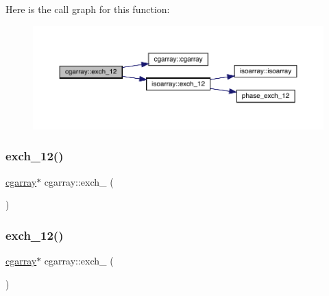 Here is the call graph for this function\+:
\nopagebreak
\begin{figure}[H]
\begin{center}
\leavevmode
\includegraphics[width=350pt]{d7/d55/classcgarray_a59212ed070a6ebdc199063d7c7eaee50_cgraph}
\end{center}
\end{figure}
\mbox{\label{classcgarray_a86ce4d7c72cddf62047e018d1199df8c}} 
\subsubsection{\texorpdfstring{exch\_12()}{exch\_12()}\hspace{0.1cm}{\footnotesize\ttfamily [2/3]}}
{\footnotesize\ttfamily \mbox{\hyperlink{classcgarray}{cgarray}}$\ast$ cgarray\+::exch\+\_ (\begin{DoxyParamCaption}{ }\end{DoxyParamCaption})}

\mbox{\label{classcgarray_a86ce4d7c72cddf62047e018d1199df8c}} 
\subsubsection{\texorpdfstring{exch\_12()}{exch\_12()}\hspace{0.1cm}{\footnotesize\ttfamily [3/3]}}
{\footnotesize\ttfamily \mbox{\hyperlink{classcgarray}{cgarray}}$\ast$ cgarray\+::exch\+\_ (\begin{DoxyParamCaption}{ }\end{DoxyParamCaption})}

\mbox{\label{classcgarray_a961a09e4792a1e3b9b9c7ac10f02bc1b}} 
